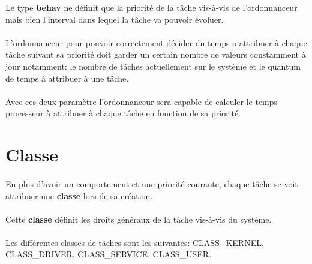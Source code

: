 \documentclass[10pt,a4wide]{article}
\begin{document}
Le type \textbf{behav} ne d\'efinit que la priorit\'e de la t\^ache vis-\`a-vis
de l'ordonnanceur mais bien l'interval dans lequel la t\^ache va pouvoir
\'evoluer.

\paragraph{}

L'ordonnanceur pour pouvoir correctement d\'ecider du temps a attribuer \`a
chaque t\^ache suivant sa priorit\'e doit garder un certain nombre de
valeurs constamment \`a jour notamment: le nombre de t\^aches actuellement
sur le syst\`eme et le quantum de temps \`a attribuer \`a une t\^ache.

\paragraph{}

Avec ces deux param\`etre l'ordonnanceur sera capable de calculer le temps
processeur \`a attribuer \`a chaque t\^ache en fonction de sa priorit\'e.

\section{Classe}

\paragraph{}

En plus d'avoir un comportement et une priorit\'e courante, chaque
t\^ache se voit attribuer une \textbf{classe} lors de sa cr\'eation.

\paragraph{}

Cette \textbf{classe} d\'efinit les droits g\'en\'eraux de la t\^ache
vis-\`a-vis du syst\`eme.

\paragraph{}

Les diff\'erentes classes de t\^aches sont les suivantes: CLASS\_KERNEL,
CLASS\_DRIVER, CLASS\_SERVICE, CLASS\_USER.

\paragraph{}
\end{document}
